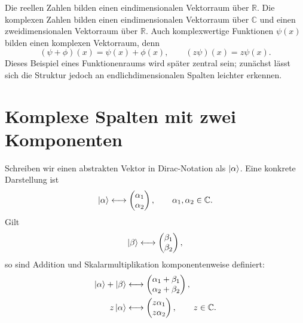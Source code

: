 Die reellen Zahlen bilden einen eindimensionalen Vektorraum über \(\mathbb R\). Die komplexen Zahlen bilden einen eindimensionalen Vektorraum über \(\mathbb C\) und einen zweidimensionalen Vektorraum über \(\mathbb R\). Auch komplexwertige Funktionen \(\psi(x)\) bilden einen komplexen Vektorraum, denn
\begin{equation}
  (\psi+\phi)(x)=\psi(x)+\phi(x),
  \qquad
  (z\psi)(x)=z\psi(x).
\end{equation}
Dieses Beispiel eines Funktionenraums wird später zentral sein; zunächst lässt sich die Struktur jedoch an endlichdimensionalen Spalten leichter erkennen.

\begin{classroomqa}
\end{classroomqa}

\section{Komplexe Spalten mit zwei Komponenten}

Schreiben wir einen abstrakten Vektor in Dirac-Notation als \(\left\lvert\alpha\right\rangle\). Eine konkrete Darstellung ist
\begin{equation}
  \left\lvert\alpha\right\rangle
  \longleftrightarrow
  \begin{pmatrix}
    \alpha_1\\
    \alpha_2
  \end{pmatrix},
  \qquad
  \alpha_1,\alpha_2\in\mathbb C.
\end{equation}
Gilt
\begin{equation}
  \left\lvert\beta\right\rangle
  \longleftrightarrow
  \begin{pmatrix}
    \beta_1\\
    \beta_2
  \end{pmatrix},
\end{equation}
so sind Addition und Skalarmultiplikation komponentenweise definiert:
\begin{align}
  \left\lvert\alpha\right\rangle+\left\lvert\beta\right\rangle
  &\longleftrightarrow
  \begin{pmatrix}
    \alpha_1+\beta_1\\
    \alpha_2+\beta_2
  \end{pmatrix},\\
  z\left\lvert\alpha\right\rangle
  &\longleftrightarrow
  \begin{pmatrix}
    z\alpha_1\\
    z\alpha_2
  \end{pmatrix},
  \qquad z\in\mathbb C.
\end{align}

